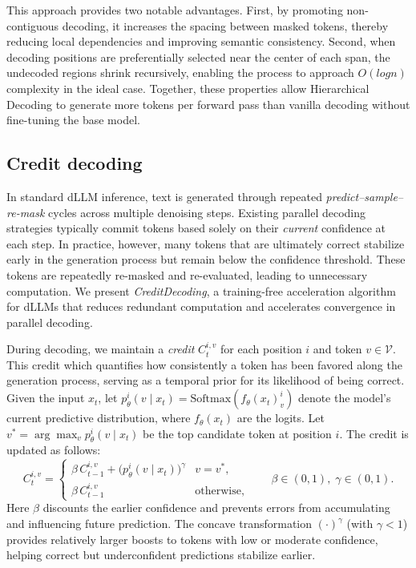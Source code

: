 \documentclass[]{antgroup}
\begin{document}
This approach provides two notable advantages. First, by promoting non-contiguous decoding, it increases the spacing between masked tokens, thereby reducing local dependencies and improving semantic consistency. Second, when decoding positions are preferentially selected near the center of each span, the undecoded regions shrink recursively, enabling the process to approach $O(log n)$ complexity in the ideal case. Together, these properties allow Hierarchical Decoding to generate more tokens per forward pass than vanilla decoding without fine-tuning the base model.

\subsection{Credit decoding}
\label{sec:CD}
In standard dLLM inference, text is generated through repeated \textit{predict–sample–re-mask} cycles across multiple denoising steps. Existing parallel decoding strategies typically commit tokens based solely on their \emph{current} confidence at each step. In practice, however, many tokens that are ultimately correct stabilize early in the generation process but remain below the confidence threshold. These tokens are repeatedly re-masked and re-evaluated, leading to unnecessary computation. We present \emph{CreditDecoding}, a training-free acceleration algorithm for dLLMs that reduces redundant computation and accelerates convergence in parallel decoding. 

During decoding, we maintain a \emph{credit} $C_t^{i,v}$ for each position $i$ and token $v \in \mathcal{V}$. This credit which quantifies how consistently a token has been favored along the generation process, serving as a temporal prior for its likelihood of being correct. Given the input $x_t$, let $p_\theta^i(v \mid x_t) = \mathrm{Softmax}(f_\theta(x_t)^i_v)$ denote the model’s current predictive distribution, where $f_\theta(x_t)$ are the logits. Let $v^* = \arg\max_v p_\theta^i(v \mid x_t)$ be the top candidate token at position $i$. The credit is updated as follows:
\begin{equation}
\label{eq:credit-update-top1}
C_t^{i,v}=
\begin{cases}
\beta\, C_{t-1}^{i,v} + \big(p_\theta^i(v\mid x_t)\big)^{\gamma} & v=v^*,\\[3pt]
\beta\, C_{t-1}^{i,v} & \text{otherwise},
\end{cases}
\qquad \beta\in(0,1),\;\gamma\in(0,1).
\end{equation}
Here $\beta$ discounts the earlier confidence and prevents errors from accumulating and influencing future prediction. The concave transformation $(\cdot)^\gamma$ (with $\gamma < 1$) provides relatively larger boosts to tokens with low or moderate confidence, helping correct but underconfident predictions stabilize earlier. 
\end{document}
